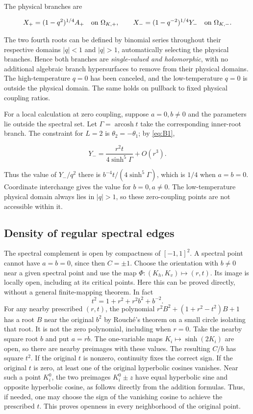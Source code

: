 \documentclass[11pt,a4paper]{article}
\numberwithin{equation}{section}
\theoremstyle{plain}
\theoremstyle{definition}
\begin{document}
The physical branches are

\begin{equation}
X_+=(1-q^2)^{1/4}A_+\quad\hbox{on }\Omega_{K,+},\qquad X_-=(1-q^{-2})^{1/4}Y_-\quad\hbox{on }\Omega_{K,-}.
\label{eq:F2}
\end{equation}

The two fourth roots can be defined by binomial series throughout their respective domains \(|q|<1\) and \(|q|>1\), automatically selecting the physical branches. Hence both branches are \emph{single-valued and holomorphic}, with no additional algebraic branch hypersurfaces to remove from their physical domains. The high-temperature \(q=0\) has been canceled, and the low-temperature \(q=0\) is outside the physical domain. The same holds on pullback to fixed physical coupling ratios.

For a local calculation at zero coupling, suppose \(a=0,b\ne0\) and the parameters lie outside the spectral set. Let \(\Gamma=\operatorname{arcosh}t\) take the corresponding inner-root branch. The constraint for \(L=2\) is \(\theta_2=-\theta_1\); by \eqref{eq:B1},

\[Y_-=\frac{r^2t}{4\sinh^5\Gamma}+O(r^3).\]

Thus the value of \(Y_-/q^2\) there is \(b^{-4}t/(4\sinh^5\Gamma)\), which is \(1/4\) when \(a=b=0\). Coordinate interchange gives the value for \(b=0,a\ne0\). The low-temperature physical domain always lies in \(|q|>1\), so these zero-coupling points are not accessible within it.

\subsection{Density of regular spectral edges}\label{sec:density}

The spectral complement is open by compactness of $[-1,1]^2$. A spectral point cannot have $a=b=0$, since then $C=\pm1$. Choose the orientation with $b\ne0$ near a given spectral point and use the map $\Phi:(K_h,K_v)\mapsto(r,t)$. Its image is locally open, including at its critical points. Here this can be proved directly, without a general finite-mapping theorem. In fact
\begin{equation}
t^2=1+r^2+r^2b^2+b^{-2}.\label{eq:B3}
\end{equation}
For any nearby prescribed $(r,t)$, the polynomial $r^2B^2+(1+r^2-t^2)B+1$ has a root $B$ near the original $b^2$ by Rouch\'e's theorem on a small circle isolating that root. It is not the zero polynomial, including when $r=0$. Take the nearby square root $b$ and put $a=rb$. The one-variable maps $K_i\mapsto\sinh(2K_i)$ are open, so there are nearby preimages with these values. The resulting $C/b$ has square $t^2$. If the original $t$ is nonzero, continuity fixes the correct sign. If the original $t$ is zero, at least one of the original hyperbolic cosines vanishes. Near such a point $K_i^0$, the two preimages $K_i^0\pm z$ have equal hyperbolic sine and opposite hyperbolic cosine, as follows directly from the addition formulas. Thus, if needed, one may choose the sign of the vanishing cosine to achieve the prescribed $t$. This proves openness in every neighborhood of the original point.
\end{document}
